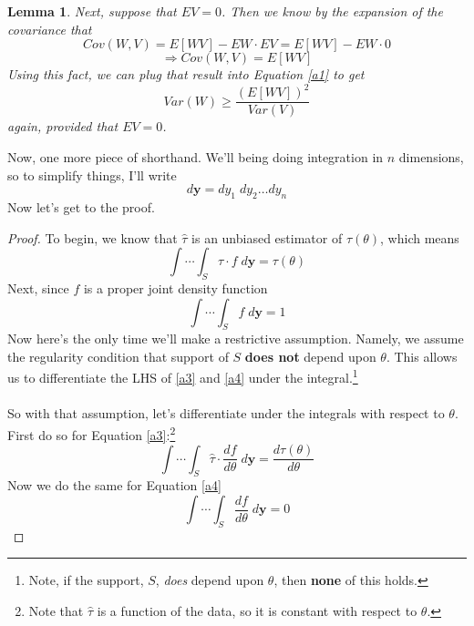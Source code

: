 \documentclass[a4paper,12pt]{scrartcl}
\newtheorem{lem}[thm]{Lemma}
\begin{document}
\begin{lem} Next, suppose that $EV = 0$. Then we know by the expansion
   of the covariance that
   \[ Cov(W,V) = E[WV] - EW\cdot EV = E[WV] - EW\cdot 0   \]
   \[ \Rightarrow Cov(W,V) = E[WV] \]
   Using this fact, we can plug that result into Equation \ref{a1} to
   get
      \begin{equation}
	 \label{a2}
	 Var(W) \geq \frac{(E[WV])^2}{Var(V)} 
      \end{equation}
   again, provided that $EV = 0$.
\end{lem}
Now, one more piece of shorthand. We'll being doing integration in
$n$ dimensions, so to simplify things, I'll write
   \[ d\mathbf{y} = dy_1 \; dy_2  \ldots dy_n  \]
Now let's get to the proof.

\begin{proof} To begin, we know that $\hat{\tau}$ is an unbiased 
   estimator of $\tau(\theta)$, which means
   \begin{equation}
      \label{a3}
      \int \cdots \int_S  \hat{\tau} \cdot f \; d\mathbf{y} = 
	 \tau(\theta)
   \end{equation}
   Next, since $f$ is a proper joint density function
   \begin{equation}
      \label{a4}
      \int \cdots \int_S   f \; d\mathbf{y} = 1
   \end{equation}
   Now here's the only time we'll make a restrictive assumption. Namely,
   we assume the regularity condition that support of $S$ 
   \textbf{does not} depend upon $\theta$.  This allows us to
   differentiate the LHS of \ref{a3} and \ref{a4} under the 
   integral.\footnote{Note, if the support, $S$, \emph{does} depend upon
   $\theta$, then \textbf{none} of this holds.}
   \\
   \\
   So with that assumption, let's differentiate under the integrals with
   respect to $\theta$. First do so for Equation \ref{a3}:\footnote{Note
      that $\hat{\tau}$ is a function of the data, so it is constant
      with respect to $\theta$.}
   \begin{equation}
      \label{a5}
      \int \cdots \int_S  \hat{\tau} \cdot \frac{df}{d\theta} 
      \; d\mathbf{y} = \frac{d\tau(\theta)}{d\theta}
   \end{equation}
   Now we do the same for Equation \ref{a4}
   \begin{equation}
      \label{a6}
      \int \cdots \int_S \frac{df}{d\theta}  \; d\mathbf{y} = 0
   \end{equation}

\end{proof}
\end{document}
